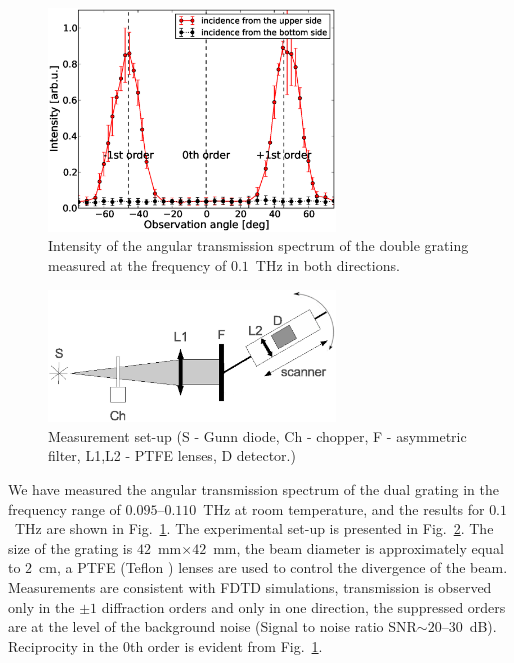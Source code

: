 \documentclass[10pt,letterpaper,twocolumn]{article} %
\begin{document}
\begin{figure}[htb]
 \begin{center} 
 \includegraphics[width=3in]{fig4.eps}
\end{center}
\caption{Intensity of the angular transmission spectrum  of the double grating measured at the frequency of $0.1$~THz in both directions. \label{fig.experim}}
\end{figure} 

\begin{figure}[htb]
 \begin{center}
 \includegraphics[width=3in]{fig5.eps}
\end{center}
\caption{Measurement set-up (S - Gunn diode, Ch - chopper, F - asymmetric filter, L1,L2 - PTFE lenses, D detector.)\label{fig.setup}}
\end{figure} 

We have measured the angular transmission spectrum of the dual grating in the frequency range of $0.095$--$0.110$~THz at room temperature, and the results for $0.1$~THz are shown in Fig.~\ref{fig.experim}. The experimental set-up is presented in Fig.~\ref{fig.setup}. The size of the grating is $42$~mm$\times 42$~mm,  the beam diameter is approximately equal to $2$~cm, a PTFE (Teflon \texttrademark) lenses are used to control the divergence of the beam. Measurements are consistent with FDTD simulations, transmission is observed only in the $\pm1$ diffraction orders and only in one direction, the suppressed  orders are at the level of the background noise (Signal to noise ratio SNR$\sim20$--$30$~dB). Reciprocity in the 0th order is evident from Fig.~\ref{fig.experim}. 
\end{document}
